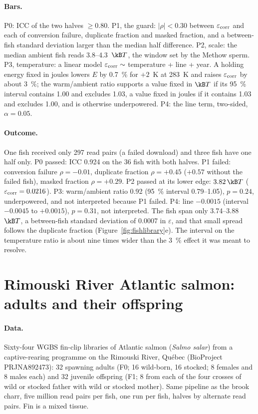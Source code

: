 \paragraph{Bars.} P0: ICC of the two halves $\ge0.80$. P1, the guard: $|\rho|<0.30$ between $\varepsilon_{\rm corr}$ and each of
conversion failure, duplicate fraction and masked fraction, and a between-fish standard deviation larger than the median
half difference. P2, scale: the median ambient fish reads 3.8--4.3~$\kB T$, the window set by the Methow sperm. P3, temperature:
a linear model $\varepsilon_{\rm corr}\sim$ temperature + line + year. A holding energy fixed in joules lowers $E$ by 0.7~\% for
$+2$~K at 283~K and raises $\varepsilon_{\rm corr}$ by about 3~\%; the warm/ambient ratio supports a value fixed in $\kB T$ if its
95~\% interval contains 1.00 and excludes 1.03, a value fixed in joules if it contains 1.03 and excludes 1.00, and is otherwise
underpowered. P4: the line term, two-sided, $\alpha=0.05$.

\paragraph{Outcome.} One fish received only 297 read pairs (a failed download) and three fish have one half only. P0 passed: ICC
0.924 on the 36 fish with both halves. P1 failed: conversion failure $\rho=-0.01$, duplicate fraction $\rho=+0.45$ ($+0.57$
without the failed fish), masked fraction $\rho=+0.29$. P2 passed at its lower edge: $3.82\,\kB T$ ($\varepsilon_{\rm corr}=0.0216$).
P3: warm/ambient ratio 0.92 (95~\% interval 0.79--1.05), $p=0.24$, underpowered, and not interpreted because P1 failed. P4: line
$-0.0015$ (interval $-0.0045$ to $+0.0015$), $p=0.31$, not interpreted. \measured{} The fish span only 3.74--3.88~$\kB T$, a
between-fish standard deviation of 0.0007 in $\varepsilon$, and that small spread follows the duplicate fraction
(Figure~\ref{fig:fishlibrary}e). The interval on the temperature ratio is about nine times wider than the 3~\% effect it was meant
to resolve.

\section{Rimouski River Atlantic salmon: adults and their offspring}

\paragraph{Data.} Sixty-four WGBS fin-clip libraries of Atlantic salmon (\emph{Salmo salar}) from a captive-rearing programme on
the Rimouski River, Qu\'ebec (BioProject PRJNA892473): 32 spawning adults (F0; 16 wild-born, 16 stocked; 8 females and 8 males
each) and 32 juvenile offspring (F1; 8 from each of the four crosses of wild or stocked father with wild or stocked mother). Same
pipeline as the brook charr, five million read pairs per fish, one run per fish, halves by alternate read pairs. Fin is a mixed
tissue.


